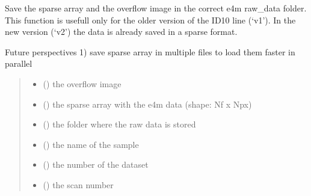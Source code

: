 \documentclass[letterpaper,10pt,english]{sphinxmanual}
\begin{document}
\begin{fulllineitems}
\label{\detokenize{index:ID10_tools.save_sparse_e4m_v1}}
\pysigstartsignatures
\pysiglinewithargsret
{}
{\sphinxparamcomma {}\sphinxparamcomma {}\sphinxparamcomma {}\sphinxparamcomma {}\sphinxparamcomma {}}
{}
\pysigstopsignatures
\sphinxAtStartPar
Save the sparse array and the overflow image in the correct e4m raw\_data folder. This function is usefull only for the older version of the ID10 line (‘v1’). In the new version (‘v2’) the data is already saved in a sparse format.

\sphinxAtStartPar
Future perspectives
1) save sparse array in multiple files to load them faster in parallel
\begin{quote}\begin{description}
\begin{itemize}
\item {} 
\sphinxAtStartPar
{} () \textendash{} the overflow image

\item {} 
\sphinxAtStartPar
{} () \textendash{} the sparse array with the e4m data (shape: Nf x Npx)

\item {} 
\sphinxAtStartPar
{} () \textendash{} the folder where the raw data is stored

\item {} 
\sphinxAtStartPar
{} () \textendash{} the name of the sample

\item {} 
\sphinxAtStartPar
{} () \textendash{} the number of the dataset

\item {} 
\sphinxAtStartPar
{} () \textendash{} the scan number

\end{itemize}

\end{description}\end{quote}

\end{fulllineitems}
\end{document}
